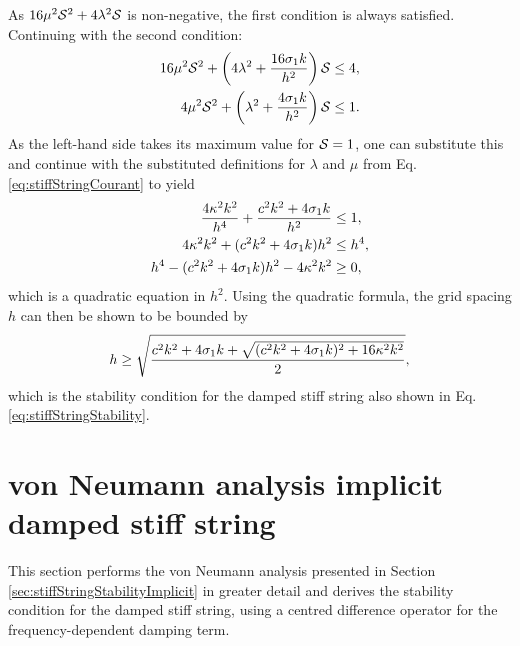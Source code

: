 As $16\mu^2\S^2+4\lambda^2\S$ is non-negative, the first condition is always satisfied. Continuing with the second condition:
\begin{align*}
    16\mu^2\S^2+\left(4\lambda^2+ \frac{16\so k}{h^2}\right)\S &\leq 4,\\
    4\mu^2\S^2+\left(\lambda^2+ \frac{4\so k}{h^2}\right)\S&\leq 1.
\end{align*}
As the left-hand side takes its maximum value for $\S= 1$, one can substitute this and continue with the substituted definitions for $\lambda$ and $\mu$ from Eq. \eqref{eq:stiffStringCourant} to yield
\begin{align*}
    \frac{4\kappa^2k^2}{h^4}+\frac{c^2k^2 + 4\so k}{h^2}&\leq 1, \\
    4\kappa^2k^2+(c^2k^2+ 4\so k)h^2&\leq h^4,\\
    h^4- (c^2k^2+ 4\so k)h^2 - 4\kappa^2k^2 &\geq 0 ,
\end{align*}
which is a quadratic equation in $h^2$. Using the quadratic formula, the grid spacing $h$ can then be shown to be bounded by
\begin{equation}
    h \geq \sqrt{\frac{c^2k^2+4\so k + \sqrt{(c^2k^2 + 4\so k)^2+16\kappa^2k^2}}{2}},
\end{equation}
which is the stability condition for the damped stiff string also shown in Eq. \eqref{eq:stiffStringStability}.

\section{von Neumann analysis implicit damped stiff string}\label{app:vonNeumannStringImplicit}
This section performs the von Neumann analysis presented in Section \ref{sec:stiffStringStabilityImplicit} in greater detail and derives the stability condition for the damped stiff string, using a centred difference operator for the frequency-dependent damping term.

